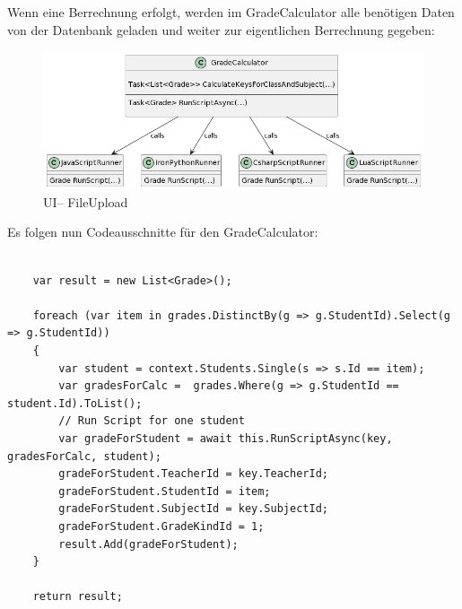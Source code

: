 Wenn eine Berrechnung erfolgt, werden im GradeCalculator alle benötigen Daten von der Datenbank geladen und weiter zur eigentlichen Berrechnung gegeben:

\begin{figure}[H]
    \centering
    \includegraphics[scale=0.5]{pics/LogicClassDiagram.png}
    \caption{UI-- FileUpload}
    \label{fig:impl:Logic}
\end{figure}
\newpage
{}
Es folgen nun Codeausschnitte für den GradeCalculator: 

\begin{lstlisting}[language={[Sharp]C}, caption=Code for loading data for Calculation, label=lst:imp:calc]
                 
    var result = new List<Grade>();

    foreach (var item in grades.DistinctBy(g => g.StudentId).Select(g => g.StudentId))
    {
        var student = context.Students.Single(s => s.Id == item);
        var gradesForCalc =  grades.Where(g => g.StudentId == student.Id).ToList();
        // Run Script for one student
        var gradeForStudent = await this.RunScriptAsync(key, gradesForCalc, student);
        gradeForStudent.TeacherId = key.TeacherId;
        gradeForStudent.StudentId = item;
        gradeForStudent.SubjectId = key.SubjectId;
        gradeForStudent.GradeKindId = 1;
        result.Add(gradeForStudent);
    }

    return result;

\end{lstlisting}

